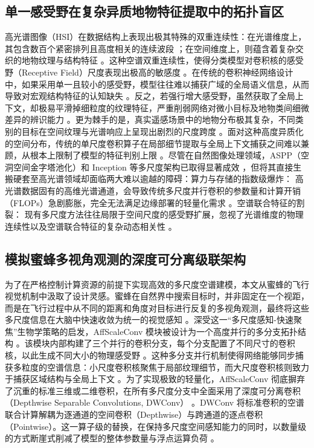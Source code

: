 \subsection{单一感受野在复杂异质地物特征提取中的拓扑盲区}
高光谱图像（HSI）在数据结构上表现出极其特殊的双重连续性：在光谱维度上，其包含数百个紧密排列且高度相关的连续波段 ；在空间维度上，则蕴含着复杂交织的地物纹理与结构特征 。这种空谱双重连续性，使得分类模型对卷积核的感受野（Receptive Field）尺度表现出极高的敏感度 。在传统的卷积神经网络设计中，如果采用单一且较小的感受野，模型往往难以捕获广域的全局语义信息，从而导致对宏观结构特征的认知缺失 。反之，若强行增大感受野，虽然获取了全局上下文，却极易平滑掉细粒度的纹理特征，严重削弱网络对微小目标及地物类间细微差异的辨识能力 。更为棘手的是，真实遥感场景中的地物分布极其复杂，不同类别的目标在空间纹理与光谱响应上呈现出剧烈的尺度跨度 。面对这种高度异质化的空间分布，传统的单尺度卷积算子在局部细节提取与全局上下文捕获之间难以兼顾，从根本上限制了模型的特征判别上限 。尽管在自然图像处理领域，ASPP（空洞空间金字塔池化）和 Inception 等多尺度架构已取得显著成效 ，但将其直接生搬硬套至高光谱领域却面临两大难以逾越的障碍：算力与存储的指数级爆炸： 高光谱数据固有的高维光谱通道，会导致传统多尺度并行卷积的参数量和计算开销（FLOPs）急剧膨胀，完全无法满足边缘部署的轻量化需求 。空谱联合特征的割裂： 现有多尺度方法往往局限于空间尺度的感受野扩展，忽视了光谱维度的物理连续性以及空谱联合特征的复杂动态相关性 。

\subsection{模拟蜜蜂多视角观测的深度可分离级联架构}
为了在严格控制计算资源的前提下实现高效的多尺度空谱建模，本文从蜜蜂的飞行视觉机制中汲取了设计灵感。蜜蜂在自然界中搜索目标时，并非固定在一个视距，而是在飞行过程中从不同的距离和角度对目标进行反复的多视角观测，最终将这些多尺度信息在大脑中快速收敛为统一的视觉感知 。深受这一“多尺度感知-快速聚焦”生物学策略的启发，AffScaleConv 模块被设计为一个高度并行的多分支拓扑结构 。该模块内部构建了三个并行的卷积分支，每个分支配置了不同尺寸的卷积核，以此生成不同大小的物理感受野 。这种多分支并行机制使得网络能够同步捕获多粒度的空谱信息：小尺度卷积核聚焦于局部纹理细节，而大尺度卷积核则致力于捕获区域结构与全局上下文 。为了实现极致的轻量化，AffScaleConv 彻底摒弃了沉重的标准三维或二维卷积，在所有多尺度分支中全面采用了深度可分离卷积（Depthwise Separable Convolutions, DWConv） 。DWConv 将标准卷积的空谱联合计算解耦为逐通道的空间卷积（Depthwise）与跨通道的逐点卷积（Pointwise）。这一算子级的替换，在保持多尺度空间感知能力的同时，以数量级的方式断崖式削减了模型的整体参数量与浮点运算负荷 。

